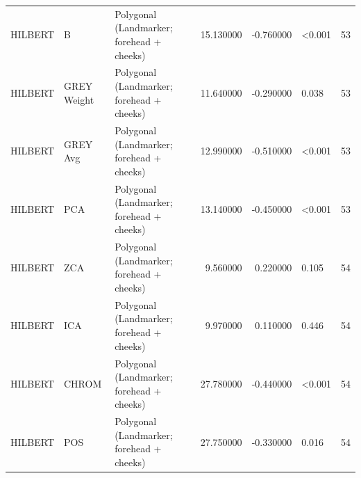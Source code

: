 \begin{table}[htbp]
\begin{tabular}{l l l r r l r}
HILBERT & B & Polygonal (Landmarker; forehead + cheeks) & 15.130000 & -0.760000 & <0.001 & 53 \\
HILBERT & GREY Weight & Polygonal (Landmarker; forehead + cheeks) & 11.640000 & -0.290000 & 0.038 & 53 \\
HILBERT & GREY Avg & Polygonal (Landmarker; forehead + cheeks) & 12.990000 & -0.510000 & <0.001 & 53 \\
HILBERT & PCA & Polygonal (Landmarker; forehead + cheeks) & 13.140000 & -0.450000 & <0.001 & 53 \\
HILBERT & ZCA & Polygonal (Landmarker; forehead + cheeks) & 9.560000 & 0.220000 & 0.105 & 54 \\
HILBERT & ICA & Polygonal (Landmarker; forehead + cheeks) & 9.970000 & 0.110000 & 0.446 & 54 \\
HILBERT & CHROM & Polygonal (Landmarker; forehead + cheeks) & 27.780000 & -0.440000 & <0.001 & 54 \\
HILBERT & POS & Polygonal (Landmarker; forehead + cheeks) & 27.750000 & -0.330000 & 0.016 & 54 \\
\bottomrule
\end{tabular}

\end{table}
